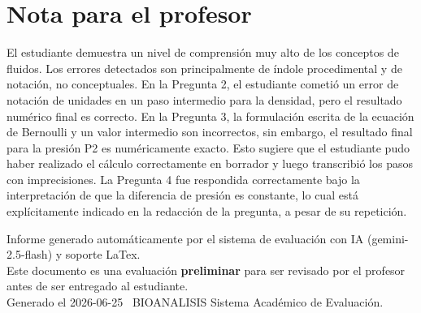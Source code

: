 \documentclass[11pt,a4paper]{article}
\begin{document}
\section*{Nota para el profesor}
\begin{tcolorbox}[
  enhanced, breakable,
  colback=yellow!8, colframe=yellow!60!black,
  fonttitle=\bfseries, coltitle=black,
  title={Observaciones para revisión manual},
  top=4pt, bottom=4pt, left=8pt, right=8pt,
]
El estudiante demuestra un nivel de comprensión muy alto de los conceptos de fluidos. Los errores detectados son principalmente de índole procedimental y de notación, no conceptuales. En la Pregunta 2, el estudiante cometió un error de notación de unidades en un paso intermedio para la densidad, pero el resultado numérico final es correcto. En la Pregunta 3, la formulación escrita de la ecuación de Bernoulli y un valor intermedio son incorrectos, sin embargo, el resultado final para la presión P2 es numéricamente exacto. Esto sugiere que el estudiante pudo haber realizado el cálculo correctamente en borrador y luego transcribió los pasos con imprecisiones. La Pregunta 4 fue respondida correctamente bajo la interpretación de que la diferencia de presión es constante, lo cual está explícitamente indicado en la redacción de la pregunta, a pesar de su repetición.
\end{tcolorbox}

\vspace{12pt}
\begin{center}
  \footnotesize\color{gray}
  Informe generado automáticamente por el sistema de evaluación con IA (gemini-2.5-flash) y soporte LaTex. \\
  Este documento es una evaluación \textbf{preliminar} para ser revisado por el profesor antes de ser entregado al 
  estudiante. \\
  Generado el 2026-06-25 \textbullet\ BIOANALISIS Sistema Académico de Evaluación.
  \end{center}
\end{document}
